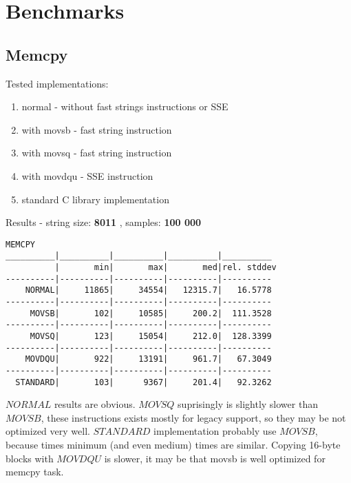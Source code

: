 \documentclass[11pt,a4paper]{article}
\begin{document}
\section{Benchmarks}\label{sec:benchmarks}

\subsection{Memcpy}\label{subsec:memcpy}
    Tested implementations:
    \begin{enumerate}
        \item normal - without fast strings instructions or SSE
        \item with movsb - fast string instruction
        \item with movsq - fast string instruction
        \item with movdqu - SSE instruction
        \item standard C library implementation
    \end{enumerate}





Results - string size: \textbf{8011} , samples: \textbf{100 000}
\begin{lstlisting}[]
MEMCPY
__________|__________|__________|__________|__________
          |       min|       max|       med|rel. stddev
----------|----------|----------|----------|----------
    NORMAL|     11865|     34554|   12315.7|   16.5778
----------|----------|----------|----------|----------
     MOVSB|       102|     10585|     200.2|  111.3528
----------|----------|----------|----------|----------
     MOVSQ|       123|     15054|     212.0|  128.3399
----------|----------|----------|----------|----------
    MOVDQU|       922|     13191|     961.7|   67.3049
----------|----------|----------|----------|----------
  STANDARD|       103|      9367|     201.4|   92.3262
\end{lstlisting}
$NORMAL$ results are obvious. $MOVSQ$ suprisingly is slightly slower than $MOVSB$, these instructions exists mostly for legacy support, so they may be not optimized very well.
$STANDARD$ implementation probably use $MOVSB$, because times minimum (and even medium) times are similar.
Copying 16-byte blocks with $MOVDQU$ is slower, it may be that movsb is well optimized for memcpy task.
\end{document}

